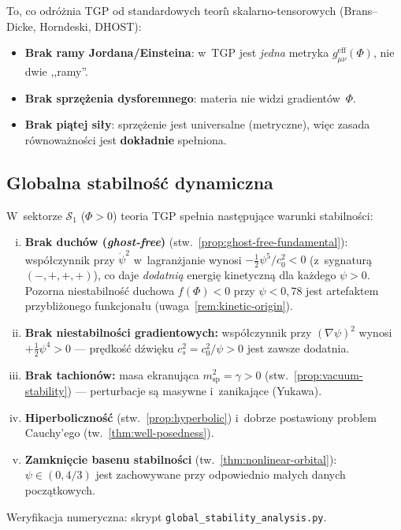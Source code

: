 \begin{remark}%
\label{rem:one-coupling}
To, co odr\'o\.znia TGP od standardowych teori\`\i{}
skalarno-tensorowych (Brans--Dicke, Horndeski, DHOST):
\begin{itemize}[nosep]
  \item \textbf{Brak ramy Jordana/Einsteina}: w~TGP jest \emph{jedna}
    metryka $g_{\mu\nu}^{\mathrm{eff}}(\Phi)$, nie dwie ,,ramy''.
  \item \textbf{Brak sprz\k{e}\.zenia dysforemnego}: materia nie
    widzi gradient\'ow~$\Phi$.
  \item \textbf{Brak pi\k{a}tej si\l{}y}: sprz\k{e}\.zenie jest
    universalne (metryczne), wi\k{e}c zasada r\'ownowa\.zno\'sci
    jest \textbf{dok\l{}adnie} spe\l{}niona.
\end{itemize}
\end{remark}

\subsection{Globalna stabilno\'s\'c dynamiczna}\label{ssec:global-stability}

\begin{theorem}\label{thm:global-stability}
W~sektorze $\mathcal{S}_1$ ($\Phi > 0$) teoria TGP spe\l{}nia
nast\k{e}puj\k{a}ce warunki stabilno\'sci:
\begin{enumerate}[(i)]
  \item \textbf{Brak duch\'ow (\emph{ghost-free})}
    (stw.~\ref{prop:ghost-free-fundamental}):
    wsp\'o\l{}czynnik przy $\dot\psi^2$ w~lagran\.zjanie
    wynosi $-\frac{1}{2}\psi^5/c_0^2 < 0$
    (z~sygnatur\k{a} $(-,+,+,+)$), co daje \emph{dodatni\k{a}}
    energi\k{e} kinetyczn\k{a} dla ka\.zdego $\psi > 0$.
    Pozorna niestabilno\'s\'c duchowa $f(\Phi) < 0$
    przy $\psi < 0{,}78$ jest artefaktem przybli\.zonego
    funkcjona\l{}u (uwaga~\ref{rem:kinetic-origin}).
  \item \textbf{Brak niestabilno\'sci gradientowych:}
    wsp\'o\l{}czynnik przy $(\nabla\psi)^2$ wynosi
    $+\frac{1}{2}\psi^4 > 0$ --- pr\k{e}dko\'s\'c d\'zwi\k{e}ku
    $c_s^2 = c_0^2/\psi > 0$ jest zawsze dodatnia.
  \item \textbf{Brak tachion\'ow:}
    masa ekranuj\k{a}ca $m_{\mathrm{sp}}^2 = \gamma > 0$
    (stw.~\ref{prop:vacuum-stability}) ---
    perturbacje s\k{a} masywne i~zanikaj\k{a}ce (Yukawa).
  \item \textbf{Hiperboliczno\'s\'c} (stw.~\ref{prop:hyperbolic})
    i~dobrze postawiony problem Cauchy'ego
    (tw.~\ref{thm:well-posedness}).
  \item \textbf{Zamkni\k{e}cie basenu stabilno\'sci}
    (tw.~\ref{thm:nonlinear-orbital}):
    $\psi \in (0, 4/3)$ jest zachowywane przy odpowiednio
    ma\l{}ych danych pocz\k{a}tkowych.
\end{enumerate}
Weryfikacja numeryczna: skrypt \texttt{global\_stability\_analysis.py}.
\end{theorem}

